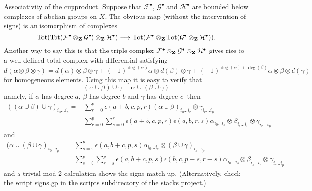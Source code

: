 \medskip\noindent
Associativity of the cupproduct. Suppose that ${\mathcal F}^\bullet$,
${\mathcal G}^\bullet$ and ${\mathcal H}^\bullet$ are bounded below
complexes of abelian groups on $X$. The obvious map
(without the intervention of signs) is an isomorphism
of complexes
$$
\text{Tot}(
\text{Tot}({\mathcal F}^\bullet \otimes_{\bf Z} {\mathcal G}^\bullet)
\otimes_{\bf Z} {\mathcal H}^\bullet
)
\longrightarrow
\text{Tot}(
{\mathcal F}^\bullet \otimes_{\bf Z}
\text{Tot}({\mathcal G}^\bullet \otimes_{\bf Z} {\mathcal H}^\bullet)
).
$$
Another way to say this is that the triple complex
${\mathcal F}^\bullet \otimes_{\bf Z} {\mathcal G}^\bullet
\otimes_{\bf Z} {\mathcal H}^\bullet$ gives rise to a well defined
total complex with differential satisfying
$$
d(\alpha \otimes \beta \otimes \gamma) =
d(\alpha) \otimes \beta \otimes \gamma +
(-1)^{\deg(\alpha)} \alpha \otimes d(\beta) \otimes \gamma +
(-1)^{\deg(\alpha) + \deg(\beta)} \alpha \otimes \beta \otimes d(\gamma)
$$
for homogeneous elements. Using this map it is easy to verify that
$$
(\alpha \cup \beta) \cup \gamma = \alpha \cup ( \beta \cup \gamma)
$$
namely, if $\alpha$ has degree $a$, $\beta$ has degree $b$ and
$\gamma$ has degree $c$, then
\begin{align*}
((\alpha \cup \beta) \cup \gamma)_{i_0 \ldots i_p}
= &
\sum\nolimits_{r = 0}^p
\epsilon(a + b, c, p, r)
(\alpha \cup \beta)_{i_0 \ldots i_r} \otimes \gamma_{i_r \ldots i_p}
\\
= &
\sum\nolimits_{r = 0}^p
\sum\nolimits_{s = 0}^r
\epsilon(a + b, c, p, r) \epsilon(a, b, r, s)
\alpha_{i_0 \ldots i_s} \otimes
\beta_{i_s \ldots i_r} \otimes
\gamma_{i_r \ldots i_p}
\end{align*}
and
\begin{align*}
(\alpha \cup (\beta \cup \gamma)_{i_0\ldots i_p}
= &
\sum\nolimits_{s = 0}^p
\epsilon(a, b + c, p, s)
\alpha_{i_0 \ldots i_s} \otimes (\beta \cup \gamma)_{i_s \ldots i_p}
\\
= &
\sum\nolimits_{s = 0}^p
\sum\nolimits_{r = s}^p
\epsilon(a, b + c, p, s) \epsilon(b, c, p - s, r - s)
\alpha_{i_0 \ldots i_s} \otimes \beta_{i_s \ldots i_r} \otimes
\gamma_{i_r \ldots i_p}
\end{align*}
and a trivial mod $2$ calculation shows the signs match up.
(Alternatively, check the script signs.gp in the scripts subdirectory
of the stacks project.)

